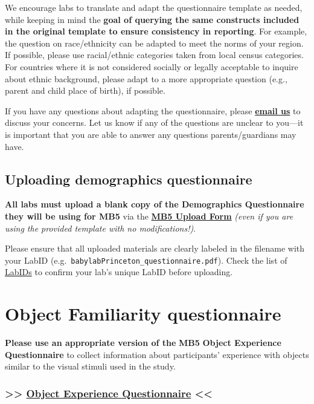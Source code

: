 \documentclass[
  letterpaper,
  DIV=11,
  numbers=noendperiod,
  oneside]{scrreprt}
\begin{document}
We encourage labs to translate and adapt the questionnaire template as
needed, while keeping in mind the \textbf{goal of querying the same
constructs included in the original template to ensure consistency in
reporting}. For example, the question on race/ethnicity can be adapted
to meet the norms of your region. If possible, please use racial/ethnic
categories taken from local census categories. For countries where it is
not considered socially or legally acceptable to inquire about ethnic
background, please adapt to a more appropriate question (e.g., parent
and child place of birth), if possible.

If you have any questions about adapting the questionnaire, please
\href{mailto:mb5@manybabies.org}{\textbf{email us}} to discuss your
concerns. Let us know if any of the questions are unclear to you---it is
important that you are able to answer any questions parents/guardians
may have.

\section{Uploading demographics
questionnaire}\label{uploading-demographics-questionnaire}

\textbf{All labs must upload a blank copy of the Demographics
Questionnaire they will be using for MB5} via the
\href{https://airtable.com/appRoqMKzcK3NsXt4/pagTs6VPOhcjesYd5/form}{\textbf{MB5
Upload Form}} \emph{(even if you are using the provided template with no
modifications!)}.

Please ensure that all uploaded materials are clearly labeled in the
filename with your LabID
(e.g.~\texttt{babylabPrinceton\_questionnaire.pdf}). Check the list of
\href{https://manybabies.org/labids/}{LabIDs} to confirm your lab's
unique LabID before uploading.

\chapter{Object Familiarity questionnaire}\label{sec-objects}

\textbf{Please use an appropriate version of the} \textbf{MB5}
\textbf{Object Experience Questionnaire} to collect information about
participants' experience with objects similar to the visual stimuli used
in the study.

\subsection{\texorpdfstring{\textgreater\textgreater{}
\href{https://drive.google.com/drive/folders/1Xd0kmVywB66GUYyePFYJ2W2ouBcnW6u3?usp=drive_link}{Object
Experience Questionnaire}
\textless\textless{}}{\textgreater\textgreater{} Object Experience Questionnaire \textless\textless{}}}\label{section}
\end{document}
